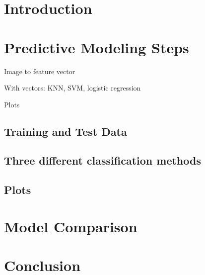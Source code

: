 \chapter{Introduction}

\chapter{Predictive Modeling Steps}

Image to feature vector

With vectors: KNN, SVM, logistic regression

Plots

\section{Training and Test Data}

\section{Three different classification methods}

\section{Plots}

\chapter{Model Comparison}

\chapter{Conclusion}
